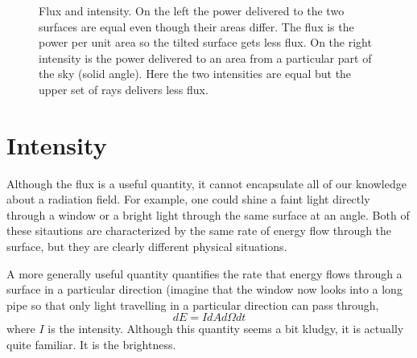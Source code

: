 \begin{figure}
\caption{Flux and intensity.  On the left the power delivered to the
  two surfaces are equal even though their areas differ.  The flux is
  the power per unit area so the tilted surface gets less flux.  On
  the right intensity is the power delivered to an area from a
  particular part of the sky (solid angle).  Here the two intensities
  are equal but the upper set of rays delivers less flux.}
\end{figure}
\section{Intensity}
\label{sec:intensity}

Although the flux is a useful quantity, it cannot encapsulate all of
our knowledge about a radiation field.  For example, one could shine a
faint light directly through a window or a bright light through the
same surface at an angle.  Both of these sitautions are characterized
by the same rate of energy flow through the surface, but they are
clearly different physical situations.

A more generally useful quantity quantifies the rate that energy flows
through a surface in a particular direction (imagine that the window
now looks into a long pipe so that only light travelling in a
particular direction can pass through,
\begin{equation}
dE = I d\!A d \Omega dt 
\label{eq:4}
\end{equation}
where $I$ is the intensity. Although this quantity seems a bit kludgy,
it is actually quite familiar.  It is the brightness.

